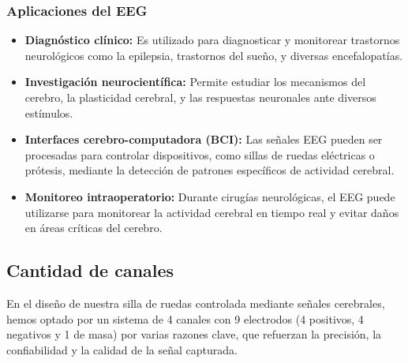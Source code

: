 \documentclass{article}
\begin{document}
\subsubsection{Aplicaciones del EEG}
\begin{itemize}
    \item \textbf{Diagnóstico clínico:} Es utilizado para diagnosticar y monitorear trastornos neurológicos como la epilepsia, trastornos del sueño, y diversas encefalopatías.
    \item \textbf{Investigación neurocientífica:} Permite estudiar los mecanismos del cerebro, la plasticidad cerebral, y las respuestas neuronales ante diversos estímulos.
    \item \textbf{Interfaces cerebro-computadora (BCI):} Las señales EEG pueden ser procesadas para controlar dispositivos, como sillas de ruedas eléctricas o prótesis, mediante la detección de patrones específicos de actividad cerebral.
    \item \textbf{Monitoreo intraoperatorio:} Durante cirugías neurológicas, el EEG puede utilizarse para monitorear la actividad cerebral en tiempo real y evitar daños en áreas críticas del cerebro.
\end{itemize}

\subsection{Cantidad de canales}
En el diseño de nuestra silla de ruedas controlada mediante señales cerebrales, hemos optado por un sistema de 4 canales con 9 electrodos (4 positivos, 4 negativos y 1 de masa) por varias razones clave, que refuerzan la precisión, la confiabilidad y la calidad de la señal capturada.
\end{document}
